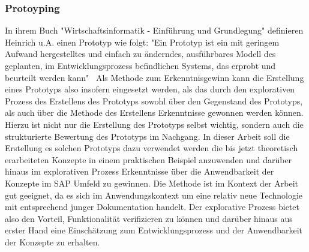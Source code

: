 \subsubsection*{Protoyping}
\label{Protoyping}
In ihrem Buch "Wirtschaftsinformatik - Einführung und Grundlegung" definieren Heinrich u.A. einen Prototyp wie folgt: "Ein Prototyp ist ein mit geringem Aufwand hergestelltes und einfach zu änderndes, ausführbares Modell des geplanten, im Entwicklungsprozess befindlichen Systems, das erprobt und beurteilt werden kann"\ \cite[S. 114]{heinrich2007wirtschaftsinformatik}
Als Methode zum Erkenntnisgewinn kann die Erstellung eines Prototyps also insofern eingesetzt werden, als das durch den explorativen Prozess des Erstellens des Prototyps sowohl über den Gegenstand des Prototyps, als auch über die Methode des Erstellens Erkenntnisse gewonnen werden können. Hierzu ist nicht nur die Erstellung des Prototyps selbst wichtig, sondern auch die strukturierte Bewertung des Prototyps im Nachgang. \cite[S. 119]{heinrich2007wirtschaftsinformatik} In dieser Arbeit soll die Erstellung es solchen Prototyps dazu verwendet werden die bis jetzt theoretisch erarbeiteten Konzepte in einem praktischen Beispiel anzuwenden und darüber hinaus im explorativen Prozess Erkenntnisse über die Anwendbarkeit der Konzepte im SAP Umfeld zu gewinnen. Die Methode ist im Kontext der Arbeit gut geeignet, da es sich im Anwendungskontext um eine relativ neue Technologie mit entsprechend junger Dokumentation handelt. Der explorative Prozess bietet also den Vorteil, Funktionalität verifizieren zu können und darüber hinaus aus erster Hand eine Einschätzung zum Entwicklungsprozess und der Anwendbarkeit der Konzepte zu erhalten.


